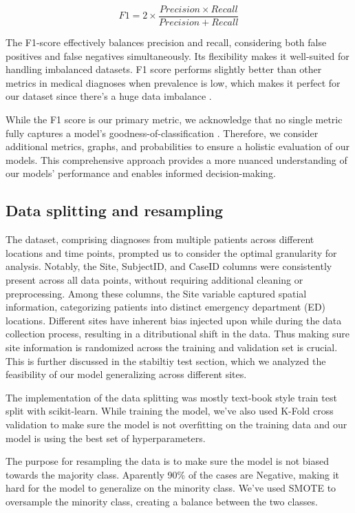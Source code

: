 \documentclass[10pt,letterpaper]{article}
\begin{document}
\begin{equation}
    F1 = 2 \times \frac{Precision \times Recall}{Precision + Recall}
\end{equation}

The F1-score effectively balances precision and recall, considering both false positives and false negatives simultaneously. Its flexibility makes it well-suited for handling imbalanced datasets. F1 score performs slightly better than other metrics in medical diagnoses when prevalence is low, which makes it perfect for our dataset since there's a huge data imbalance \cite{hicks2022evaluation}.

While the F1 score is our primary metric, we acknowledge that no single metric fully captures a model's goodness-of-classification \cite{hicks2022evaluation}. Therefore, we consider additional metrics, graphs, and probabilities to ensure a holistic evaluation of our models. This comprehensive approach provides a more nuanced understanding of our models' performance and enables informed decision-making.

\subsection{Data splitting and resampling}

The dataset, comprising diagnoses from multiple patients across different locations and time points, prompted us to consider the optimal granularity for analysis. Notably, the Site, SubjectID, and CaseID columns were consistently present across all data points, without requiring additional cleaning or preprocessing. Among these columns, the Site variable captured spatial information, categorizing patients into distinct emergency department (ED) locations. Different sites have inherent bias injected upon while during the data collection process, resulting in a ditributional shift in the data. Thus making sure site information is randomized across the training and validation set is crucial. This is further discussed in the stabiltiy test section, which we analyzed the feasibility of our model generalizing across different sites.

The implementation of the data splitting was mostly text-book style train test split with scikit-learn. While training the model, we've also used K-Fold cross validation to make sure the model is not overfitting on the training data and our model is using the best set of hyperparameters.

The purpose for resampling the data is to make sure the model is not biased towards the majority class. Aparently 90\% of the cases are Negative, making it hard for the model to generalize on the minority class. We've used SMOTE to oversample the minority class, creating a balance between the two classes.
\end{document}

